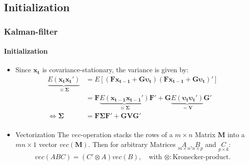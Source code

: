 \documentclass{beamer} %
\begin{document}
\subsection{Initialization}
\begin{frame}\frametitle{Kalman-filter}\framesubtitle{Initialization}
  \begin{itemize}
    \item Since $\mathbf{x_t}$ is covariance-stationary, the variance is given by:
\begin{align*}
    \underbrace{E(\mathbf{x_t} \mathbf{x_t}')}_{\equiv \boldsymbol{\Sigma}}&=E\left[(\mathbf{F} \mathbf{x_{t-1}} + \mathbf{G} \boldsymbol{\upsilon_t})(\mathbf{F} \mathbf{x_{t-1}} + \mathbf{G} \boldsymbol{\upsilon_t})'\right] \\
    &= \mathbf{F} \underbrace{E(\mathbf{x_{t-1}}\mathbf{x_{t-1}}')}_{\equiv \boldsymbol{\Sigma}}\mathbf{F}' + \mathbf{G} \underbrace{E(\boldsymbol{\upsilon_t} \boldsymbol{\upsilon_t}')}_{=\mathbf{V}} \mathbf{G}'\\
\Leftrightarrow \boldsymbol{\Sigma} &= \mathbf{F} \boldsymbol{\Sigma} \mathbf{F'} + \mathbf{G} \mathbf{V} \mathbf{G}'\\
\end{align*}
\item \begin{block}{Vectorization}
    The $vec$-operation stacks the rows of a $m\times n$ Matrix $\mathbf{M}$ into a $mn\times 1$ vector $vec(\mathbf{M})$. Then for arbitrary Matrices $\underset{m\times n}{A}$,$\underset{n\times p}{B}$ and $\underset{p \times k}{C}$:
    \begin{align*}
        vec(ABC) = (C' \otimes A)vec(B), \quad \text{with } \otimes: \text{Kronecker-product.}
    \end{align*}
\end{block}
  \end{itemize}
\end{frame}
\end{document}
